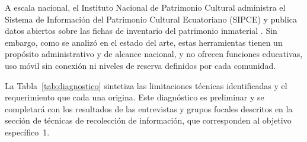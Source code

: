 A escala nacional, el Instituto Nacional de Patrimonio Cultural administra el Sistema de Información del Patrimonio Cultural Ecuatoriano (SIPCE) y publica datos abiertos sobre las fichas de inventario del patrimonio inmaterial \cite{inpc2026sipce,inpc2025datos}. Sin embargo, como se analizó en el estado del arte, estas herramientas tienen un propósito administrativo y de alcance nacional, y no ofrecen funciones educativas, uso móvil sin conexión ni niveles de reserva definidos por cada comunidad.

La Tabla~\ref{tab:diagnostico} sintetiza las limitaciones técnicas identificadas y el requerimiento que cada una origina. Este diagnóstico es preliminar y se completará con los resultados de las entrevistas y grupos focales descritos en la sección de técnicas de recolección de información, que corresponden al objetivo específico~1.

